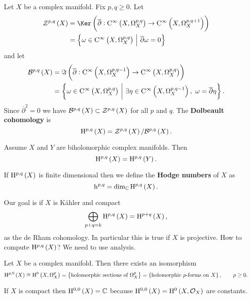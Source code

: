 Let $ X $ be a complex manifold. Fix $ p, q \ge 0 $. Let
\begin{align*}
\ZZZ^{p, q}\br{X}
& = \Ker \br{\overline{\partial} : \C^\infty\br{X, \Omega_X^{p, q}} \to \C^\infty\br{X, \Omega_X^{p, q + 1}}} \\
& = \cbr{\omega \in \C^\infty\br{X, \Omega_X^{p, q}} \st \overline{\partial}\omega = 0}
\end{align*}
and let
\begin{align*}
\BBB^{p, q}\br{X}
& = \Im \br{\overline{\partial} : \C^\infty\br{X, \Omega_X^{p, q - 1}} \to \C^\infty\br{X, \Omega_X^{p, q}}} \\
& = \cbr{\omega \in \C^\infty\br{X, \Omega_X^{p, q}} \st \exists \eta \in \C^\infty\br{X, \Omega_X^{p, q - 1}}, \ \omega = \overline{\partial}\eta}.
\end{align*}
Since $ \overline{\partial}^2 = 0 $ we have $ \BBB^{p, q}\br{X} \subset \ZZZ^{p, q}\br{X} $ for all $ p $ and $ q $. The \textbf{Dolbeault cohomology} is
$$ \H^{p, q}\br{X} = \ZZZ^{p, q}\br{X} / \BBB^{p, q}\br{X}. $$

\pagebreak

\begin{exercise*}
Assume $ X $ and $ Y $ are biholomorphic complex manifolds. Then
$$ \H^{p, q}\br{X} = \H^{p, q}\br{Y}. $$
\end{exercise*}

If $ \H^{p, q}\br{X} $ is finite dimensional then we define the \textbf{Hodge numbers} of $ X $ as
$$ \h^{p, q} = \dim_\CC \H^{p, q}\br{X}. $$


Our goal is if $ X $ is K\"ahler and compact
$$ \bigoplus_{p + q = k} \H^{p, q}\br{X} = \H^{p + q}\br{X}, $$
as the de Rham cohomology. In particular this is true if $ X $ is projective. How to compute $ \H^{p, q}\br{X} $? We need to use analysis.

\begin{proposition}
Let $ X $ be a complex manifold. Then there exists an isomorphism
$$ \H^{p, 0}\br{X} \cong \H^0\br{X, \Omega_X^p} = \cbr{\text{holomorphic sections of} \ \Omega_X^p} = \cbr{\text{holomorphic $ p $-forms on} \ X}, \qquad p \ge 0. $$
\end{proposition}

\begin{remark*}
If $ X $ is compact then $ \H^{0, 0}\br{X} = \CC $ because $ \H^{0, 0}\br{X} = \H^0\br{X, \OOO_X} $ are constants.
\end{remark*}

